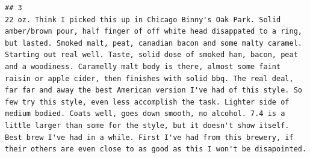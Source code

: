 \documentclass[
  a4paper,
]{article}
\begin{document}
\begin{verbatim}
## 3                                                                                                                                                                                                                                                                                                                                                                                                                                                                                                                                                                                                                                                                                                                                                                                                                                                                                                                                                                                                                                                                                                                                                                                                                                                                                                       22 oz. Think I picked this up in Chicago Binny's Oak Park. Solid amber/brown pour, half finger of off white head disappated to a ring, but lasted. Smoked malt, peat, canadian bacon and some malty caramel. Starting out real well. Taste, solid dose of smoked ham, bacon, peat and a woodiness. Caramelly malt body is there, almost some faint raisin or apple cider, then finishes with solid bbq. The real deal, far far and away the best American version I've had of this style. So few try this style, even less accomplish the task. Lighter side of medium bodied. Coats well, goes down smooth, no alcohol. 7.4 is a little larger than some for the style, but it doesn't show itself. Best brew I've had in a while. First I've had from this brewery, if their others are even close to as good as this I won't be disapointed.

\end{verbatim}
\end{document}
